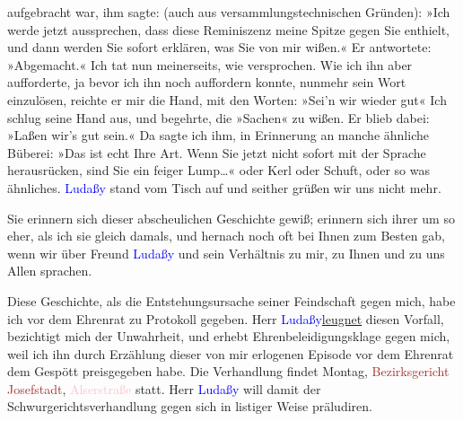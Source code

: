                aufgebracht war, ihm sagte: (auch aus versammlungstechnischen Gründen): »Ich werde
               jetzt aussprechen, dass diese Reminiszenz meine Spitze gegen Sie enthielt, und dann
               werden Sie sofort erklären, was Sie von mir wißen.« Er antwortete: »Abgemacht.« Ich
               tat nun meinerseits, wie versprochen. Wie ich ihn aber aufforderte, ja bevor ich ihn
               noch auffordern konnte, nunmehr sein Wort einzulösen, reichte er mir die Hand, mit
               den Worten: »Sei’n wir wieder gut{\dotstwo}« Ich schlug seine Hand
               aus, und begehrte, die »Sachen« zu wißen. Er blieb dabei: »Laßen wir’s gut sein.« Da
               sagte ich ihm, in Erinnerung an manche ähnliche Büberei: »Das ist echt Ihre Art. Wenn
               Sie jetzt nicht sofort mit {\pb}der
               Sprache herausrücken, sind Sie ein feiger Lump{\dots}« oder
                  Kerl{\dotstwo} oder Schuft, oder so was ähnliches. \textcolor{blue}{Ludaßy}{}\ledrightnote{\textcolor{blue}{Julius von Gans-Ludassy}} stand vom Tisch auf und seither grüßen
               wir uns nicht mehr.\pend
           
\pstart
           Sie erinnern sich dieser abscheulichen Geschichte gewiß; erinnern sich ihrer um so
               eher, als ich sie gleich damals, und hernach noch oft bei Ihnen zum Besten gab, wenn
               wir über Freund \textcolor{blue}{Ludaßy}{}\ledrightnote{\textcolor{blue}{Julius von Gans-Ludassy}} und sein Verhältnis zu
               mir, zu Ihnen und zu uns Allen sprachen.\pend
           
\pstart
           Diese Geschichte, als die Entstehungsursache seiner Feindschaft gegen mich, habe ich
               vor dem Ehrenrat zu Protokoll gegeben. Herr \textcolor{blue}{Ludaßy}{}\ledrightnote{\textcolor{blue}{Julius von Gans-Ludassy}}{ }\uline{leugnet} diesen Vorfall, bezichtigt mich der
               Unwahrheit, und erhebt Ehrenbeleidigungsklage gegen mich, weil ich ihn durch
               Erzählung dieser von mir erlogenen Episode vor dem Ehrenrat dem Gespött preisgegeben
               habe. Die Verhandlung findet Montag, \textcolor{brown}{Bezirksgericht Josefstadt}{}\ledrightnote{\textcolor{brown}{Bezirksgericht Wien Josefstadt}}, \textcolor{pink}{Alserstraße}{}\ledrightnote{\textcolor{pink}{Alser Straße}} statt. Herr \textcolor{blue}{Ludaßy}{}\ledrightnote{\textcolor{blue}{Julius von Gans-Ludassy}} will
               damit der Schwurgerichtsverhandlung gegen sich in listiger Weise präludiren.\pend
           
